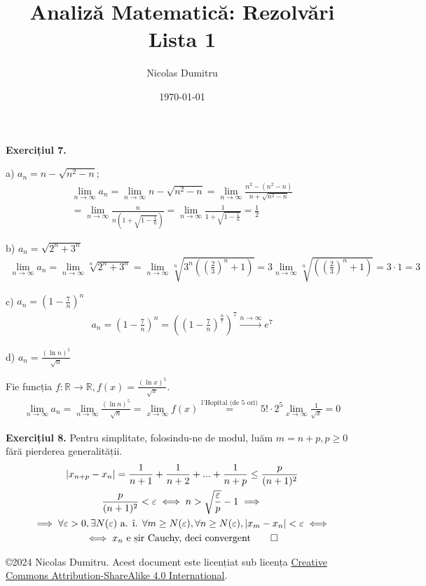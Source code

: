 \documentclass[a4paper]{article}
\title{Analiză Matematică: Rezolvări Lista 1}
\author{Nicolas Dumitru}
\date{\today}
\theoremstyle{definition}
\theoremstyle{plain} %
\theoremstyle{remark}
\newcommand{\seqlim}{\lim_{n \to \infty}}
\renewcommand{\epsilon}{\varepsilon} %
\begin{document}
\maketitle

\textbf{Exercițiul 7.}

a) \(a_n = n - \sqrt{n^2 - n}\);
\begin{gather*}
	\seqlim a_n = \seqlim n - \sqrt{n^2 - n}
	= \seqlim \frac{n^2 - (n^2 - n)}{n + \sqrt{n^2 - n}} \\
	= \seqlim \frac{n}{n\left(1 + \sqrt{1 - \frac{1}{n}}\right)}
	= \seqlim \frac{1}{1 + \sqrt{1 - \frac{1}{n}}} = \frac{1}{2}
\end{gather*}

b) \(a_n = \sqrt{2^n + 3^n}\)
\begin{gather*}
	\seqlim a_n = \seqlim \sqrt[n]{2^n + 3^n}
	= \seqlim \sqrt[n]{3^n \left(\left(\frac{2}{3}\right)^n + 1\right)}
	= 3 \seqlim \sqrt[n]{\left(\left(\frac{2}{3}\right)^n + 1\right)}
	= 3 \cdot 1 = 3
\end{gather*}

c) \(a_n = \left(1 - \frac{7}{n}\right)^n\)
\begin{gather*}
	a_n = \left(1 - \frac{7}{n}\right)^n = \left(\left(1 - \frac{7}{n}\right)^\frac{n}{7}\right)^7 \xrightarrow{n \to \infty} e^7
\end{gather*}


d) \(a_n = \frac{(\ln n)^5}{\sqrt n}\)

Fie funcția \(f: \mathbb R \to \mathbb R, f(x) = \frac{(\ln x)^5}{\sqrt x}\).
\begin{gather*}
	\seqlim a_n = \seqlim \frac{(\ln n)^5}{\sqrt n} = \lim_{x \to \infty} f(x) \overset{\text{l'Hopital (de 5 ori)}}{=} 5! \cdot 2^5 \lim_{x \to \infty} \frac{1}{\sqrt x} = 0
\end{gather*}

\textbf{Exercițiul 8.}
Pentru simplitate, folosindu-ne de modul, luăm \(m = n + p, p \ge 0\) fără pierderea generalității.
\begin{gather*}
	| x_{n + p} - x_n | = \frac{1}{n + 1} + \frac{1}{n + 2} + ... + \frac{1}{n
		+ p} \le \frac{p}{(n + 1)^2} \\
	\frac{p}{(n + 1)^2} < \epsilon \iff n > \sqrt{\frac{\epsilon}{p}} - 1 \implies \\
	\implies \forall \epsilon > 0, \exists N(\epsilon) \text{ a. î. } \forall m
	\ge N(\epsilon), \forall n \ge N(\epsilon), |x_m - x_n| < \epsilon \iff \\
	\iff x_n \text{ e șir Cauchy, deci convergent} \qed
\end{gather*}

\begin{flushright}
	\copyright 2024 Nicolas Dumitru.
	Acest document este licențiat sub licența \href{https://creativecommons.org/licenses/by-sa/4.0/}{Creative Commons Attribution-ShareAlike 4.0 International}.

\end{flushright}
\end{document}
